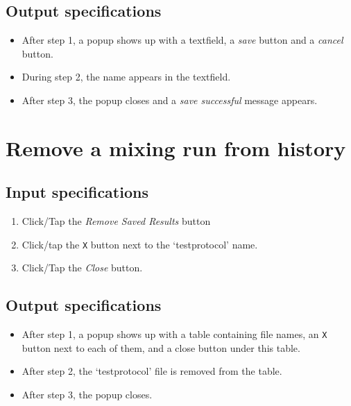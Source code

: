 \subsection*{Output specifications}
\begin{itemize}
\item After step 1, a popup shows up with a textfield, a \emph{save} button and a \emph{cancel} button.
\item During step 2, the name appears in the textfield.
\item After step 3, the popup closes and a \emph{save successful} message appears.
\end{itemize}
 
\section{Remove a mixing run from history}

\subsection*{Input specifications}
\begin{enumerate}
\item Click/Tap the \emph{Remove Saved Results} button
\item Click/tap the \texttt{X} button next to the `testprotocol' name.
\item Click/Tap the \emph{Close} button.
\end{enumerate}

\subsection*{Output specifications}
\begin{itemize}
\item After step 1, a popup shows up with a table containing file names, an \texttt{X} button next to each of them, and a close button under this table.
\item After step 2, the `testprotocol' file is removed from the table.
\item After step 3, the popup closes.
\end{itemize}

